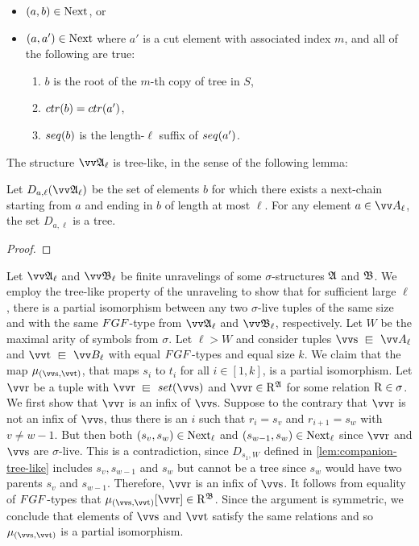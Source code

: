 \begin{itemize}
  \item $(a,b) \in \mathrm{Next}$, or
  \item $(a,a') \in \mathrm{Next}$ where $a'$ is a cut element with associated index $m$, and all of the following are true:
        \begin{enumerate}
          \item $b$ is the root of the $m$-th copy of tree in $S$,
          \item $\ctr{b} = \ctr{a'}$,
          \item $\seq{b}$ is the length-$\ell$ suffix of $\seq{a'}$.
        \end{enumerate}
\end{itemize}

\noindent
The structure $\unravel{A}_{\ell}$ is tree-like, in the sense of the following lemma:
\begin{lemma}\label{lem:companion-tree-like}
  Let $D_{a, \ell}(\unravel{A}_{\ell})$ be the set of elements $b$ for which there exists a next-chain starting from $a$ and ending in $b$ of length at most $\ell$.
  For any element $a \in \unraveldom{A}_{\ell}$, the set $D_{a, \ell}$ is a tree.
\end{lemma}
\begin{proof}
\end{proof}
Let $\unravel{A}_{\ell}$ and $\unravel{B}_{\ell}$ be finite unravelings of some $\sigma$-structures ${\mathfrak{A}}$ and ${\mathfrak{B}}$.
We employ the tree-like property of the unraveling to show that for sufficient large $\ell$, there is a partial isomorphism between any two $\sigma$-live tuples of the same size and with the same $\FGF$-type from $\unravel{A}_{\ell}$ and $\unravel{B}_{\ell}$, respectively.
Let $W$ be the maximal arity of symbols from $\sigma$.
Let $\ell > W$ and consider tuples $\elemtuptuples \sqin \unraveldom{A}_{\ell}$ and $\elemtuptuplet \sqin \unraveldom{B}_{\ell}$ with equal $\FGF$-types and equal size $k$.
We claim that the map $\mu_{(\elemtuptuples, \elemtuptuplet)}$, that maps $s_{i}$ to $t_{i}$ for all $i \in [1, k]$, is a partial isomorphism.
Let $\elemtuptupler$ be a tuple with $\elemtuptupler \sqin \set(\elemtuptuples)$ and $\elemtuptupler \in \relR^{\str{A}}$ for some relation $\mathrm{R} \in \sigma$.
We first show that $\elemtuptupler$ is an infix of $\elemtuptuples$.
Suppose to the contrary that $\elemtuptupler$ is not an infix of $\elemtuptuples$, thus there is an $i$ such that $r_{i} = s_{v}$ and $r_{i+1} = s_{w}$ with $v \ne w - 1$.
But then both $(s_{v}, s_{w}) \in \mathrm{Next}_{\ell}$ and $(s_{w-1}, s_{w}) \in \mathrm{Next}_{\ell}$ since $\elemtuptupler$ and $\elemtuptuples$ are $\sigma$-live.
This is a contradiction, since $D_{s_{1}, W}$ defined in \cref{lem:companion-tree-like} includes $s_{v}, s_{w-1}$ and $s_{w}$ but cannot be a tree since $s_{w}$ would have two parents $s_{v}$ and $s_{w-1}$.
Therefore, $\elemtuptupler$ is an infix of $\elemtuptuples$.
It follows from equality of $\FGF$-types that $\mu_{(\elemtuptuples, \elemtuptuplet)}[\elemtuptupler] \in \relR^{\str{B}}$.
Since the argument is symmetric, we conclude that elements of $\elemtuptuples$ and $\elemtuptuplet$ satisfy the same relations and so $\mu_{(\elemtuptuples, \elemtuptuplet)}$ is a partial isomorphism.

